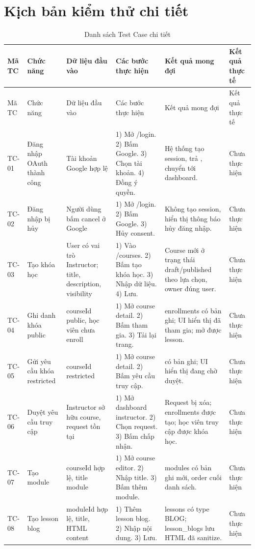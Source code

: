 \documentclass[12pt,a4paper]{report}
\begin{document}
\section{Kịch bản kiểm thử chi tiết}
\begingroup\scriptsize
\begin{longtable}{L{1.15cm} L{2.0cm} L{2.35cm} L{3.1cm} L{3.0cm} L{1.55cm}}
\caption{Danh sách Test Case chi tiết}\label{tab:test-cases}\\
\toprule
Mã TC & Chức năng & Dữ liệu đầu vào & Các bước thực hiện & Kết quả mong đợi & Kết quả thực tế \\
\midrule
\endfirsthead
\toprule
Mã TC & Chức năng & Dữ liệu đầu vào & Các bước thực hiện & Kết quả mong đợi & Kết quả thực tế \\
\midrule
\endhead
TC-01 & Đăng nhập OAuth thành công & Tài khoản Google hợp lệ & 1) Mở /login. 2) Bấm Google. 3) Chọn tài khoản. 4) Đồng ý quyền. & Hệ thống tạo session, trả , chuyển tới dashboard. & Chưa thực hiện \\
TC-02 & Đăng nhập bị hủy & Người dùng bấm cancel ở Google & 1) Mở /login. 2) Bấm Google. 3) Hủy consent. & Không tạo session, hiển thị thông báo hủy đăng nhập. & Chưa thực hiện \\
TC-03 & Tạo khóa học & User có vai trò Instructor; title, description, visibility & 1) Vào /courses. 2) Bấm tạo khóa học. 3) Nhập dữ liệu. 4) Lưu. & Course mới ở trạng thái draft/published theo lựa chọn, owner đúng user. & Chưa thực hiện \\
TC-04 & Ghi danh khóa public & courseId public, học viên chưa enroll & 1) Mở course detail. 2) Bấm tham gia. 3) Tải lại trang. & enrollments có bản ghi; UI hiển thị đã tham gia; mở được lesson. & Chưa thực hiện \\
TC-05 & Gửi yêu cầu khóa restricted & courseId restricted & 1) Mở course detail. 2) Bấm yêu cầu truy cập. &  có bản ghi; UI hiển thị đang chờ duyệt. & Chưa thực hiện \\
TC-06 & Duyệt yêu cầu truy cập & Instructor sở hữu course, request tồn tại & 1) Mở dashboard instructor. 2) Chọn request. 3) Bấm chấp nhận. & Request bị xóa; enrollments được tạo; học viên truy cập được khóa học. & Chưa thực hiện \\
TC-07 & Tạo module & courseId hợp lệ, title module & 1) Mở course editor. 2) Nhập title. 3) Bấm thêm module. & modules có bản ghi mới, order cuối danh sách. & Chưa thực hiện \\
TC-08 & Tạo lesson blog & moduleId hợp lệ, title, HTML content & 1) Thêm lesson blog. 2) Nhập nội dung. 3) Lưu. & lessons có type BLOG; lesson\_blogs lưu HTML đã sanitize. & Chưa thực hiện \\

\end{longtable}
\end{document}
